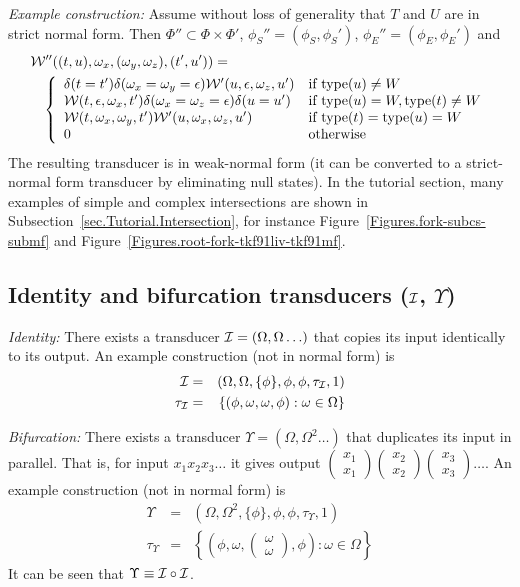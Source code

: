 \documentclass{article}
\newcommand{\secref}[1]{Subsection~\ref{sec.#1}}
\newcommand{\seclabel}[1]{\label{sec.#1}}
\newcommand{\figref}[1]{Figure~\ref{Figures.#1}}
\newcommand\transequiv{\equiv}
\newcommand\identity{{\cal I}}
\newcommand\fork{\circ}
\newcommand\idfork{\Upsilon}
\newcommand\States{\Phi}
\newcommand\Transitions{\tau}
\newcommand\transitionsof[1]{\Transitions_{#1}}
\newcommand\startstate{\phi_S}
\newcommand\laststate{\phi_E}
\newcommand\weight{{\cal W}}
\newcommand\statetype{\mbox{type}}
\newcommand\dup[1]{\left( \begin{array}{l} #1 \\ #1 \end{array} \right)}
\begin{document}
{\em Example construction:}
Assume without loss of generality that $T$ and $U$ are in strict normal form.
Then $\States'' \subset \States \times \States'$,
$\startstate''=(\startstate,\startstate')$, $\laststate''=(\laststate,\laststate')$
and
\begin{eqnarray*}
\lefteqn{\weight''((t,u),\omega_x,(\omega_y,\omega_z),(t',u')) =} & & \\
 & & \left\{ \begin{array}{ll}
\delta(t=t') \delta(\omega_x=\omega_y=\epsilon) \weight'(u,\epsilon,\omega_z,u') & \mbox{if $\statetype(u) \neq W$} \\
\weight(t,\epsilon,\omega_x,t') \delta(\omega_x=\omega_z=\epsilon) \delta(u=u') & \mbox{if $\statetype(u) = W,\statetype(t) \neq W$} \\
\weight(t,\omega_x,\omega_y,t') \weight'(u,\omega_x,\omega_z,u') & \mbox{if $\statetype(t) = \statetype(u) = W$} \\
0 & \mbox{otherwise}
\end{array} \right.
\end{eqnarray*}
The resulting transducer is in weak-normal form (it can be converted to a strict-normal form transducer by eliminating null states).
In the tutorial section, many examples of simple and complex intersections are shown in \secref{Tutorial.Intersection}, for instance \figref{fork-subcs-submf} and  \figref{root-fork-tkf91liv-tkf91mf}. 



\subsection{Identity and bifurcation transducers ($\identity$, $\idfork$)}
\seclabel{Identity}

{\em Identity:}
There exists a transducer $\identity=(\Omega,\Omega\ldots)$ that copies its input identically to its output.
An example construction (not in normal form) is
\begin{eqnarray*}
\identity & = & (\Omega,\Omega,\{\phi\},\phi,\phi,\transitionsof{\identity},1) \\
\transitionsof{\identity} & = & \left\{(\phi,\omega,\omega,\phi):\omega\in\Omega\right\}
\end{eqnarray*}

{\em Bifurcation:}
There exists a transducer $\idfork=(\Omega,\Omega^2\ldots)$ that duplicates its input in parallel.
That is, for input $x_1 x_2 x_3 \ldots$ it gives output $\dup{x_1}\dup{x_2}\dup{x_3}\ldots$.
An example construction (not in normal form) is
\begin{eqnarray*}
\idfork & = & (\Omega,\Omega^2,\{\phi\},\phi,\phi,\transitionsof{\idfork},1) \\
\transitionsof{\idfork} & = & \left\{\left(\phi,\omega,\dup{\omega},\phi\right):\omega\in\Omega\right\}
\end{eqnarray*}
It can be seen that $\idfork \transequiv \identity \fork \identity$.
\end{document}
